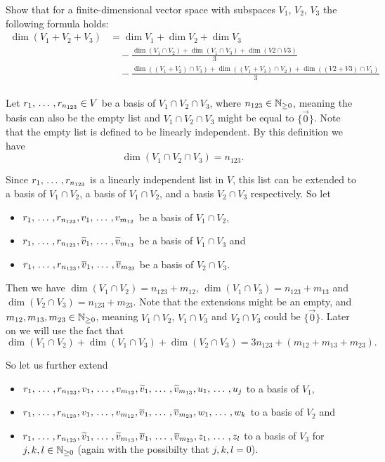 \begin{xrcs}
  Show that for a finite-dimensional vector space with subspaces $V_1$, $V_2$, $V_3$ the following formula holds:
  \begin{equation}
  \begin{aligned}
    \dim (V_1 + V_2 + V_3)  &= \dim V_1 + \dim V_2 + \dim V_3 \\
    & \quad - \frac{\dim (V_1 \cap V_2) + \dim (V_1 \cap V_3) + \dim (V2 \cap V3)}{3} \\
    & \quad - \frac{ \dim \left(  (V_1 + V_2) \cap V_3 \right) + \dim \left( (V_1 + V_3) \cap V_2 \right)+ \dim \left( (V2 + V3) \cap V_1 \right) }{3} \\
  \end{aligned}
\end{equation}

   Let $r_1, {\, \ldots \,\,}, r_{n_{123}} \in V$ be a basis of $V_1 \cap V_2 \cap V_3$, where $n_{123} \in \mathbb{N}_{\geq 0}$, meaning the basis can also be the empty list and $V_1 \cap V_2 \cap V_3$ might be equal to $\{\vec 0\}$. Note that the empty list is defined to be linearly independent. By this definition we have
\[
\dim (V_1 \cap V_2 \cap V_3) = n_{123}.
\]

Since $r_1, {\, \ldots \,\,}, r_{n_{123}}$ is a linearly independent list in $V$, this list can be extended to a basis of $V_1 \cap V_2$, a basis of $V_1 \cap V_2$, and a basis $V_2 \cap V_3$ respectively. So let
\begin{itemize}
  \item $r_1, {\, \ldots \,\,}, r_{n_{123}}, v_1, {\, \ldots \,\,}, v_{m_{12}}$ be a basis of $V_1 \cap V_2$,
  \item $r_1, {\, \ldots \,\,}, r_{n_{123}}, \widetilde{v}_1, {\, \ldots \,\,}, \widetilde{v}_{m_{13}}$ be a basis of $V_1 \cap V_3$ and
  \item $r_1, {\, \ldots \,\,}, r_{n_{123}}, \overline{v}_1, {\, \ldots \,\,}, \overline{v}_{m_{23}}$ be a basis of $V_2 \cap V_3$.
\end{itemize}

Then we have $\dim (V_1 \cap V_2) = n_{123} + m_{12}$, $\dim (V_1 \cap V_3) = n_{123} + m_{13}$ and $\dim (V_2 \cap V_3) = n_{123} + m_{23}$. Note that the extensions might be an empty, and $m_{12}, m_{13}, m_{23} \in \mathbb{N}_{\geq 0}$, meaning $V_1 \cap V_2$, $V_1 \cap V_3$ and $V_2 \cap V_3$ could be $\{ \vec 0 \}$. Later on we will use the fact that
\[
\dim (V_1 \cap V_2) + \dim (V_1 \cap V_3) + \dim (V_2 \cap V_3) = 3n_{123} + (m_{12} + m_{13} + m_{23}).
\]

So let us further extend
\begin{itemize}
  \item $r_1, {\, \ldots \,\,}, r_{n_{123}}, v_1, {\, \ldots \,\,}, v_{m_{12}}, \widetilde{v}_1, {\, \ldots \,\,}, \widetilde{v}_{m_{13}}, u_1, {\, \ldots \,\,}, u_j$ to a basis of $V_1$,
  \item $r_1, {\, \ldots \,\,}, r_{n_{123}}, v_1, {\, \ldots \,\,}, v_{m_{12}}, \overline{v}_1, {\, \ldots \,\,}, \overline{v}_{m_{23}}, w_1, {\, \ldots \,\,}, w_k$ to a basis of $V_2$ and
  \item $r_1, {\, \ldots \,\,}, r_{n_{123}}, \widetilde{v}_1, {\, \ldots \,\,}, \widetilde{v}_{m_{13}}, \overline{v}_1, {\, \ldots \,\,}, \overline{v}_{m_{23}}, z_1, {\, \ldots \,\,}, z_l$ to a basis of $V_3$ for $j,k,l \in \mathbb{N}_{\geq 0}$ (again with the possibilty that $j,k,l = 0$).
\end{itemize}


\end{xrcs}
